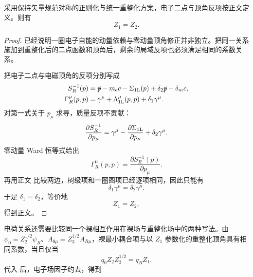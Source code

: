 \begin{proposition}
采用保持矢量规范对称的正则化与统一重整化方案，电子二点与顶角反项按正文定义。则有
\begin{equation}
{Z_1=Z_2.}
\label{eq:qed-Z1-Z2-dp53}
\end{equation}
\end{proposition}
\begin{proof}
 已经说明一圈电子自能的动量依赖与零动量顶角修正并非独立。把同一关系施加到重整化后的二点函数和顶角后，剩余的局域反项也必须满足相同的系数关系。

把电子二点与电磁顶角的反项分别写成
\begin{align*}
S_R^{-1}(p)
&=\slashed p-m_{\mathrm e} c-\Sigma_{\rm 1L}(p)
+\delta_2\slashed p-\delta_m c,\\
\Gamma_R^\mu(p,p)
&=\gamma^\mu+\Lambda_{\rm 1L}^\mu(p,p)
+\delta_1\gamma^\mu.
\end{align*}
对第一式关于 \(p_\mu\) 求导，质量反项不贡献：
\begin{equation*}
\frac{\partial S_R^{-1}}{\partial p_\mu}
=\gamma^\mu
-\frac{\partial\Sigma_{\rm 1L}}{\partial p_\mu}
+\delta_2\gamma^\mu.
\end{equation*}
零动量 Ward 恒等式给出
\begin{equation*}
\Gamma_R^\mu(p,p)
=\frac{\partial S_R^{-1}(p)}{\partial p_\mu}.
\end{equation*}
再用正文 比较两边，树级项和一圈图项已经逐项相同，因此只能有
\begin{equation*}
\delta_1\gamma^\mu=\delta_2\gamma^\mu.
\end{equation*}
于是 \(\delta_1=\delta_2\)，等价地
\begin{equation*}
Z_1=Z_2,
\end{equation*}
得到正文。
\end{proof}


电荷关系还需要比较同一个裸相互作用在裸场与重整化场中的两种写法。由
\(\psi_0=Z_2^{1/2}\psi_R\)、\(A_{0\mu}=Z_3^{1/2}A_{R\mu}\)，裸最小耦合项与以 \(Z_1\) 参数化的重整化顶角具有相同系数，当且仅当
\begin{equation}
{
q_0 Z_2 Z_3^{1/2}=q_R Z_1.}
\label{eq:qed-bare-renormalized-charge-match-dp68}
\end{equation}
代入 后，电子场因子约去，得到



